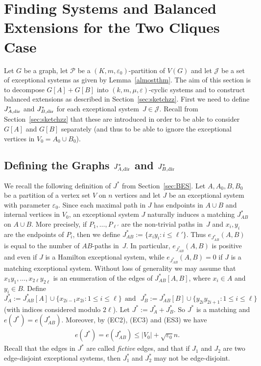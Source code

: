 \documentclass{memo-l}
\def\COMMENT#1{}
\def\eps{\varepsilon}
\numberwithin{section}{chapter}
\numberwithin{equation}{section}
\numberwithin{firstthm}{section}
\numberwithin{figure}{section}
\begin{document}
{\section[Finding Systems and Balanced Extensions for Two Cliques Case]{Finding Systems and Balanced Extensions for the Two Cliques Case}
Let $G$ be a graph, let $\mathcal{P}$ be a $(K,m, \eps_0)$-partition of $V(G)$ and
let $\mathcal{J}$ be a set of exceptional systems as given by Lemma~\ref{almostthm}.
The aim of this section is to decompose $G[A]+G[B]$ into $(k, m, \mu , \eps )$-cyclic systems and to construct balanced extensions
as described in Section~\ref{sec:sketchzz}. First we need to define $J^*_{A, {\rm dir}}$ and $J^*_{B, {\rm dir}}$ for each exceptional system~$J\in \mathcal{J}$.
Recall from Section~\ref{sec:sketchzz} that these are introduced in order to be able to consider $G[A]$ and $G[B]$ separately
(and thus to be able to ignore the exceptional vertices in $V_0=A_0 \cup B_0$).


\subsection{Defining the Graphs $J^*_{A,{\rm dir}}$ and $J^*_{B, {\rm dir}}$} \label{sec:J*2clique}
We recall the following definition of $J^*$ from Section~\ref{sec:BES}.
Let $A,A_0,B,B_0$ be a partition of a vertex set $V$ on $n$ vertices and let $J$ be an exceptional system with parameter $\eps_0$.
Since each maximal path in $J$ has endpoints in $A \cup B$ and internal vertices in $V_0$, an exceptional system $J$
naturally induces a matching $J^*_{AB}$ on $A \cup B$.
More precisely, if $P_1, \dots ,P_{\ell'}$ are the non-trivial paths in~$J$ and $x_i, y_i$ are the endpoints of $P_i$, then
we define $J^*_{AB} := \{x_iy_i : i  \le \ell'\}$. Thus $e_{J^*_{AB}}(A,B)$ is equal to the number of $AB$-paths in~$J$.
In particular, $e_{J^*_{AB}}(A,B)$ is positive and even if $J$ is a Hamilton exceptional system, while $e_{J^*_{AB}}(A,B)=0$ if $J$
is a matching exceptional system. Without loss of generality we may assume that $x_1y_1, \dots, x_{2\ell}y_{2\ell}$ is
an enumeration of the edges of $J^*_{AB}[A,B]$, where $x_i \in A$ and $y_i \in B$. Define 
$$
J_A^* := J^*_{AB}[A] \cup \{x_{2i-1} x_{2i} :1 \le i \le \ell \} \ \
 \mbox{and} \ \ \ J_B^* := J^*_{AB}[B] \cup \{y_{2i} y_{2i+1} :1 \le i \le \ell \}
$$ 
(with indices considered modulo $2\ell$).
Let $J^* := J_A^* + J_B^*$. So $J^*$ is a matching and $e(J^*) = e(J^*_{AB})$. Moreover, by (EC2), (EC3) and (ES3) we have
\begin{align}
	e(J^*) = e(J^*_{AB}) \le |V_0| + \sqrt{\eps_0} n. \label{ESeqzz}
\end{align}
Recall that the  edges in $J^*$ are called \emph{fictive} edges, and  that if $J_1$ and $J_2$ are two edge-disjoint exceptional systems, then $J^*_1$
and $J^*_2$ may not be edge-disjoint.%
   \COMMENT{Daniela: deleted the following, since it is not needed anymore: However, we will always view fictive edges as being distinct from each other and from the edges
in other graphs. So in particular, whenever $J_1$ and $J_2$ are two exceptional systems, we will view $J^*_1$
and $J^*_2$ as being edge-disjoint.}



}
\end{document}
